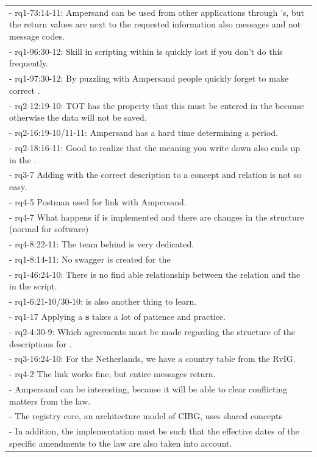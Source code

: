 \begin{xltabular}{\textwidth}{|X|}
\\-	rq1-73:14-11: Ampersand can be used from other applications through 's, but the return values are next to the requested information also messages and not message codes.
\\-	rq1-96:30-12: Skill in scripting within  is quickly lost if you don't do this frequently.
\\-	rq1-97:30-12: By puzzling with Ampersand people quickly forget to make correct .
\\-	rq2-12:19-10: TOT has the property that this must be entered in the  because otherwise the data will not be saved.
\\-	rq2-16:19-10/11-11: Ampersand has a hard time determining a period.
\\-	rq2-18:16-11: Good to realize that the {meaning} you write down also ends up in the .
\\-	rq3-7 Adding  with the correct description to a concept and relation is not so easy.
\\-	rq4-5 Postman used for  link with Ampersand.
\\-	rq4-7 What happens if  is implemented and there are changes in the structure (normal for software)
\\-	rq4-8:22-11: The team behind  is very dedicated.
\\-	 rq1-8:14-11: No swagger is created for the 
\\-	rq1-46:24-10: There is no find able relationship between the {relation} and the  in the script.
\\-	 rq1-6:21-10/30-10:  is also another thing to learn.
\\-	 rq1-17 Applying a \textbf{s} takes a lot of patience and practice.
\\-	 rq2-4:30-9: Which agreements must be made regarding the structure of the descriptions for .
\\-	 rq3-16:24-10: For the Netherlands, we have a country table from the RvIG.
\\-	 rq4-2 The  link works fine, but entire messages return.
\\-	Ampersand can be interesting, because it will be able to clear conflicting matters from the law.
\\-	The registry core, an architecture model of CIBG, uses shared concepts
\\-	In addition, the implementation must be such that the effective dates of the specific amendments to the law are also taken into account.

\end{xltabular}
